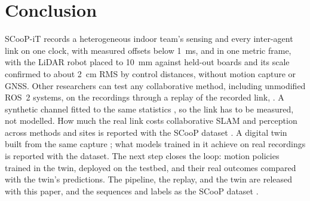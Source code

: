 \section{Conclusion}
\label{sec:conclusion}
SCooP-iT records a heterogeneous indoor team's sensing and every
inter-agent link on one clock, with measured offsets below
\SI{1}{\milli\second}, and in one metric frame, with the LiDAR robot
placed to \SI{10}{\milli\metre} against held-out boards and its scale
confirmed to about \SI{2}{\centi\metre} RMS by control distances,
without motion capture or GNSS. Other researchers can test any collaborative method,
including unmodified ROS~2 systems, on the recordings through a replay
of the recorded link, . A
synthetic channel fitted to the same statistics , so the link has to be
measured, not modelled. How much the real link costs collaborative
SLAM and perception across methods and sites is reported with the SCooP
dataset \cite{scoop_dataset}. A
digital twin built from the same capture ; what models trained in it
achieve on real recordings is reported with the dataset. The next step closes the loop: motion
policies trained in the twin, deployed on the testbed, and their real
outcomes compared with the twin's predictions. The pipeline, the replay, and the twin are released with this
paper, and the sequences and labels as the SCooP dataset
\cite{scoop_dataset}.
